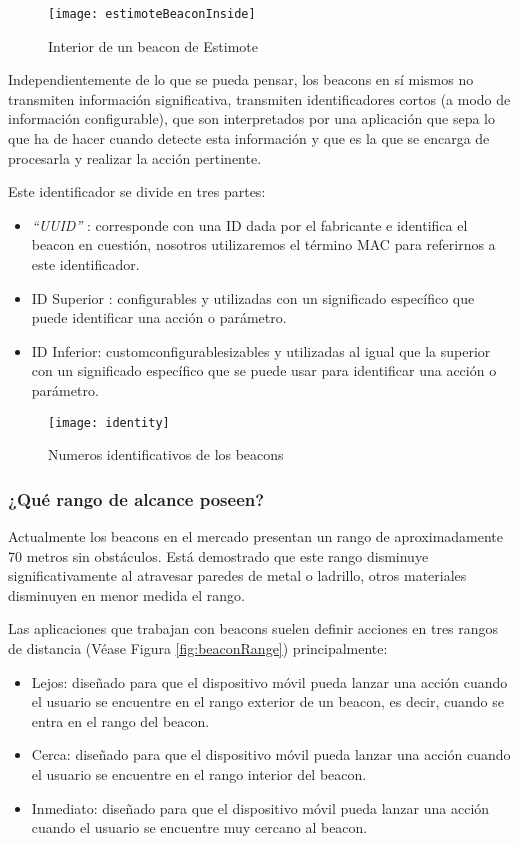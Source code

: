 \begin{figure}[h]
	\centering
	\texttt{[image: estimoteBeaconInside]}
	\caption{Interior de un beacon de Estimote}
	\label{fig:beaconInside}
\end{figure}

Independientemente de lo que se pueda pensar, los beacons en sí mismos no transmiten información significativa, transmiten identificadores cortos (a modo de información configurable), que son interpretados por una aplicación que sepa lo que ha de hacer cuando detecte esta información y que es la que se encarga de procesarla y realizar la acción pertinente.

Este identificador se divide en tres partes: 

\begin{itemize}
\item \textit{"`UUID"'} \cite{URL::UUID} : corresponde con una ID dada por el fabricante e identifica el beacon en cuestión, nosotros utilizaremos el término MAC para referirnos a este identificador. \label{el:mac}
\item ID Superior : configurables y utilizadas con un significado específico que puede identificar una acción o parámetro. 
\item ID Inferior: customconfigurablesizables y utilizadas al igual que la superior con un significado específico que se puede usar para identificar una acción o parámetro.
\end{itemize}

\begin{figure}[h]
	\centering
	\texttt{[image: identity]}
	\caption{Numeros identificativos de los beacons}
	\label{fig:beaconId}
\end{figure}

\subsubsection{¿Qué rango de alcance poseen?}

Actualmente los beacons en el mercado presentan un rango de aproximadamente 70 metros sin obstáculos. Está demostrado que este rango disminuye significativamente al atravesar paredes de metal o ladrillo, otros materiales disminuyen en menor medida el rango. 

Las aplicaciones que trabajan con beacons suelen definir acciones en tres rangos de distancia (Véase Figura \ref{fig:beaconRange}) principalmente: 

\begin{itemize}
\item Lejos: diseñado para que el dispositivo móvil pueda lanzar una acción cuando el usuario se encuentre en el rango exterior de un beacon, es decir, cuando se entra en el rango del beacon.
\item Cerca: diseñado para que el dispositivo móvil pueda lanzar una acción cuando el usuario se encuentre en el rango interior del beacon. 
\item Inmediato: diseñado para que el dispositivo móvil pueda lanzar una acción cuando el usuario se encuentre muy cercano al beacon.
\end{itemize}

